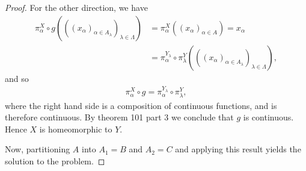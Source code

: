 \documentclass[12pt]{extarticle}
\newcommand{\<}{\langle}
\renewcommand{\>}{\rangle}
\theoremstyle{definition}
\begin{document}
\begin{proof}
  For the other direction, we have
  \begin{align*}
    \pi_{\alpha}^X \circ g (((x_{\alpha})_{\alpha \in A_{\lambda}})_{\lambda \in \Lambda}) &= \pi_{\alpha}^X((x_{\alpha})_{\alpha \in A}) = x_{\alpha} \\
    &= \pi_{\alpha}^{Y_{\lambda}} \circ \pi_{\lambda}^Y (((x_{\alpha})_{\alpha \in A_{\lambda}})_{\lambda \in \Lambda}),
  \end{align*}
  and so
  \begin{align*}
    \pi_{\alpha}^X \circ g = \pi_{\alpha}^{Y_{\lambda}} \circ \pi_{\lambda}^Y,
  \end{align*}
  where the right hand side is a composition of continuous functions, and is therefore continuous. By theorem 101 part 3 we conclude that $g$ is continuous. Hence $X$ is homeomorphic to $Y$.

  Now, partitioning $A$ into $A_{1} = B$ and $A_{2} = C$ and applying this result yields the solution to the problem. 
\end{proof}
\end{document}
